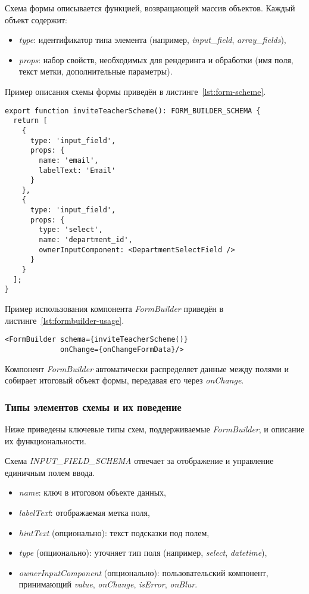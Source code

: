 Схема формы описывается функцией, возвращающей массив объектов. Каждый объект содержит:

\begin{itemize}
  \item \textit{type}: идентификатор типа элемента (например, \textit{input\_field}, \textit{array\_fields}),
  \item \textit{props}: набор свойств, необходимых для рендеринга и обработки (имя поля, текст метки, дополнительные параметры).
\end{itemize}

Пример описания схемы формы приведён в листинге~\ref{lst:form-scheme}.

\begin{lstlisting}[caption=Пример описания схемы формы,label=lst:form-scheme]
export function inviteTeacherScheme(): FORM_BUILDER_SCHEMA {
  return [
    {
      type: 'input_field',
      props: {
        name: 'email',
        labelText: 'Email'
      }
    },
    {
      type: 'input_field',
      props: {
        type: 'select',
        name: 'department_id',
        ownerInputComponent: <DepartmentSelectField />
      }
    }
  ];
}
\end{lstlisting}

Пример использования компонента \textit{FormBuilder} приведён в листинге~\ref{lst:formbuilder-usage}.

\begin{lstlisting}[caption=Использование \textit{FormBuilder},label=lst:formbuilder-usage]
<FormBuilder schema={inviteTeacherScheme()} 
			 onChange={onChangeFormData}/>
\end{lstlisting}

Компонент \textit{FormBuilder} автоматически распределяет данные между полями и собирает итоговый объект формы, передавая его через \textit{onChange}.

\subsubsection{Типы элементов схемы и их поведение}
Ниже приведены ключевые типы схем, поддерживаемые \textit{FormBuilder}, и описание их функциональности.


Схема \textit{INPUT\_FIELD\_SCHEMA} отвечает за отображение и управление единичным полем ввода.
\begin{itemize}
  \item \textit{name}: ключ в итоговом объекте данных,
  \item \textit{labelText}: отображаемая метка поля,
  \item \textit{hintText} (опционально): текст подсказки под полем,
  \item \textit{type} (опционально): уточняет тип поля (например, \textit{select}, \textit{datetime}),
  \item \textit{ownerInputComponent} (опционально): пользовательский компонент, принимающий \textit{value}, \textit{onChange}, \textit{isError}, \textit{onBlur}.
\end{itemize}

